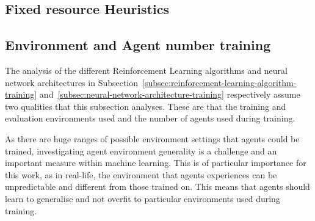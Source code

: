 \subsection{Fixed resource Heuristics}
\label{subsec:fixed-resource-heuristics}

%

\subsection{Environment and Agent number training}
\label{subsec:environment-and-agent-number-training}
The analysis of the different Reinforcement Learning algorithms and neural network architectures in
Subsection~\ref{subsec:reinforcement-learning-algorithm-training} and~\ref{subsec:neural-network-architecture-training}
respectively assume two qualities that this subsection analyses. These are that the training and evaluation environments
used and the number of agents used during training.

As there are huge ranges of possible environment settings that agents could be trained, investigating agent environment
generality is a challenge and an important measure within machine learning. This is of particular importance for this
work, as in real-life, the environment that agents experiences can be unpredictable and different from those
trained on. This means that agents should learn to generalise and not overfit to particular environments used during
training.

